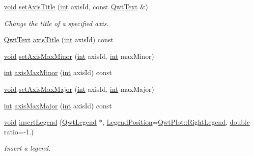 \begin{DoxyCompactItemize}
\hyperlink{group___u_a_v_objects_plugin_ga444cf2ff3f0ecbe028adce838d373f5c}{void} \hyperlink{class_qwt_plot_ad134a193ab40ce33743365558d0303c4}{set\-Axis\-Title} (\hyperlink{ioapi_8h_a787fa3cf048117ba7123753c1e74fcd6}{int} axis\-Id, const \hyperlink{class_qwt_text}{Qwt\-Text} \&)
\begin{DoxyCompactList}\small\item\em Change the title of a specified axis. \end{DoxyCompactList}\item 
\hyperlink{class_qwt_text}{Qwt\-Text} \hyperlink{class_qwt_plot_a7807148d386457345025571e2a8e0983}{axis\-Title} (\hyperlink{ioapi_8h_a787fa3cf048117ba7123753c1e74fcd6}{int} axis\-Id) const 
\item 
\hyperlink{group___u_a_v_objects_plugin_ga444cf2ff3f0ecbe028adce838d373f5c}{void} \hyperlink{class_qwt_plot_aa45b271684d6202061f1afcfa70e7cf6}{set\-Axis\-Max\-Minor} (\hyperlink{ioapi_8h_a787fa3cf048117ba7123753c1e74fcd6}{int} axis\-Id, \hyperlink{ioapi_8h_a787fa3cf048117ba7123753c1e74fcd6}{int} max\-Minor)
\item 
\hyperlink{ioapi_8h_a787fa3cf048117ba7123753c1e74fcd6}{int} \hyperlink{class_qwt_plot_adbe9b0fcfaf8a5baa49a3cb4ed425b42}{axis\-Max\-Minor} (\hyperlink{ioapi_8h_a787fa3cf048117ba7123753c1e74fcd6}{int} axis\-Id) const 
\item 
\hyperlink{group___u_a_v_objects_plugin_ga444cf2ff3f0ecbe028adce838d373f5c}{void} \hyperlink{class_qwt_plot_a34df698558c9bd9c38bdd8ff04cc6c41}{set\-Axis\-Max\-Major} (\hyperlink{ioapi_8h_a787fa3cf048117ba7123753c1e74fcd6}{int} axis\-Id, \hyperlink{ioapi_8h_a787fa3cf048117ba7123753c1e74fcd6}{int} max\-Major)
\item 
\hyperlink{ioapi_8h_a787fa3cf048117ba7123753c1e74fcd6}{int} \hyperlink{class_qwt_plot_a250fdf9506a71857d183983823a491d4}{axis\-Max\-Major} (\hyperlink{ioapi_8h_a787fa3cf048117ba7123753c1e74fcd6}{int} axis\-Id) const 
\item 
\hyperlink{group___u_a_v_objects_plugin_ga444cf2ff3f0ecbe028adce838d373f5c}{void} \hyperlink{class_qwt_plot_a6e23cad2bce7b04a09f18fa139341d5c}{insert\-Legend} (\hyperlink{class_qwt_legend}{Qwt\-Legend} $\ast$, \hyperlink{class_qwt_plot_a31aacb65b5c049dde8c34a0d8482661b}{Legend\-Position}=\hyperlink{class_qwt_plot_a31aacb65b5c049dde8c34a0d8482661ba5273f8002504c24f9dae6ce09b08f03c}{Qwt\-Plot\-::\-Right\-Legend}, \hyperlink{_super_l_u_support_8h_a8956b2b9f49bf918deed98379d159ca7}{double} ratio=-\/1.)
\begin{DoxyCompactList}\small\item\em Insert a legend. \end{DoxyCompactList}\item 

\end{DoxyCompactItemize}
